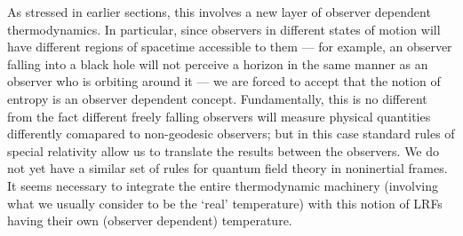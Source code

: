 \documentclass[12pt]{iopart}
\begin{document}
As stressed in earlier sections, this involves a new layer of observer dependent thermodynamics. 
In particular, since observers in different states of motion will have different regions of spacetime accessible to them --- for example, an observer falling into a black hole will not perceive a horizon in the same manner as an observer who is orbiting around it --- we are forced to accept that the notion of entropy is an observer dependent concept. 
 Fundamentally,  this is no different from the fact different freely falling observers will measure physical quantities differently comapared to non-geodesic observers; but in this case standard rules of special relativity allow us to translate the results between the observers. We do not yet have  a similar set of rules for quantum field theory in noninertial frames.
 It seems necessary to  integrate the entire thermodynamic machinery (involving what we usually consider to be the `real' temperature)
 with this notion of LRFs having their own (observer dependent) temperature. 
 
\end{document}
